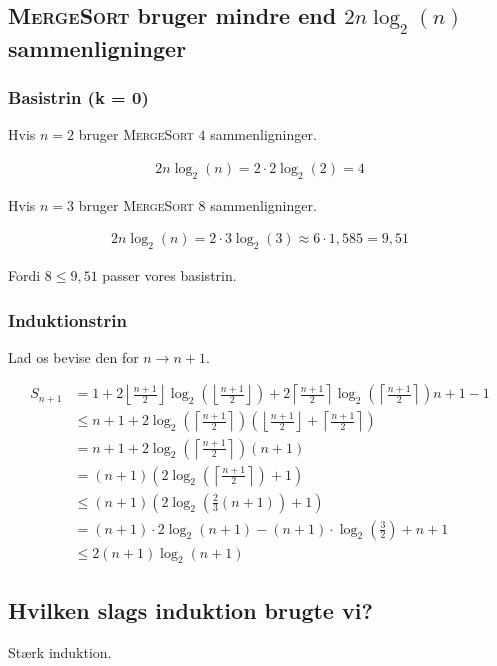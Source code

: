 \subsection{\textsc{MergeSort} bruger mindre end \(2n\log_2(n)\) sammenligninger}
\label{subsec:merge-sort-bruger-mindre-end-sammenligninger}

\subsubsection{Basistrin (k = 0)}

Hvis \(n = 2\) bruger \textsc{MergeSort} \(4\) sammenligninger.

\begin{equation}
    \begin{aligned}
        2n\log_2(n) = 2 \cdot 2\log_2(2) = 4
    \end{aligned}
    \label{eq:equation20}
\end{equation}

Hvis \(n = 3\) bruger \textsc{MergeSort} \(8\) sammenligninger.

\begin{equation}
    \begin{aligned}
        2n\log_2(n) = 2 \cdot 3\log_2(3) \approx 6 \cdot 1,585 = 9,51
    \end{aligned}
    \label{eq:equation21}
\end{equation}

Fordi \(8 \leq 9,51\) passer vores basistrin.

\subsubsection{Induktionstrin}

Lad os bevise den for \(n \rightarrow n + 1\).

\begin{equation}
    \begin{aligned}
        S_{n + 1} & = 1 + 2 \left\lfloor \frac{n + 1}{2} \right\rfloor \log_2\left( \left\lfloor \frac{n + 1}{2}
        \right\rfloor \right) + 2 \left\lceil \frac{n + 1}{2} \right\rceil \log_2\left( \left\lceil \frac{n + 1}{2}
        \right\rceil \right) n + 1 - 1 \\
        & \leq n + 1 + 2 \log_2\left( \left\lceil \frac{n + 1}{2} \right\rceil \right)\left( \left\lfloor \frac{n +
        1}{2} \right\rfloor + \left\lceil \frac{n + 1}{2} \right\rceil \right) \\
        & = n + 1 + 2\log_2\left( \left\lceil \frac{n + 1}{2} \right\rceil \right)(n + 1) \\
        & = (n + 1) \left(2\log_2\left( \left\lceil \frac{n + 1}{2} \right\rceil \right) + 1 \right) \\
        & \leq (n + 1) \left( 2\log_2\left( \frac{2}{3}(n + 1) \right) + 1 \right) \\
        & = (n + 1) \cdot 2 \log_2(n + 1) - (n + 1) \cdot \log_2\left( \frac{3}{2} \right) + n + 1 \\
        & \leq 2(n + 1) \log_2(n + 1)
    \end{aligned}
    \label{eq:equation22}
\end{equation}

\subsection{Hvilken slags induktion brugte vi?}\label{subsec:hvilken-slags-induktion-brugte-vi?}

Stærk induktion.

